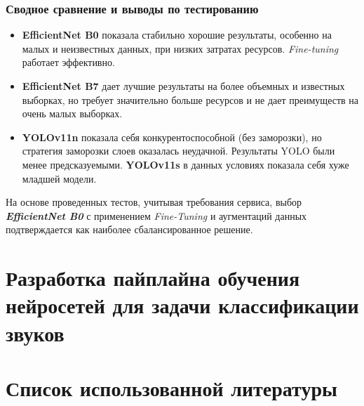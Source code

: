 \documentclass[14pt]{extarticle}
\begin{document}
\subsubsection{Сводное сравнение и выводы по тестированию}
\begin{itemize}[leftmargin=*, itemsep=5pt]
    \item \textbf{EfficientNet B0} показала стабильно хорошие результаты, особенно на малых и неизвестных данных, при низких затратах ресурсов. \textit{Fine-tuning} работает эффективно.
    \item \textbf{EfficientNet B7} дает лучшие результаты на более объемных и известных выборках, но требует значительно больше ресурсов и не дает преимуществ на очень малых выборках.
    \item \textbf{YOLOv11n} показала себя конкурентоспособной (без заморозки), но стратегия заморозки слоев оказалась неудачной. Результаты YOLO были менее предсказуемыми. \textbf{YOLOv11s} в данных условиях показала себя хуже младшей модели.
\end{itemize}
На основе проведенных тестов, учитывая требования сервиса, выбор \textbf{\textit{EfficientNet B0}} с применением \textit{Fine-Tuning} и аугментаций данных подтверждается как наиболее сбалансированное решение.
\newpage
\section{Разработка пайплайна обучения нейросетей для задачи классификации звуков}

\newpage
\section*{Список использованной литературы}
\printbibliography[heading=none]
\end{document}
